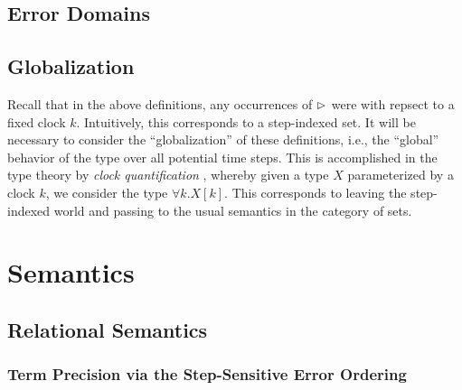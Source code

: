 \subsection{Error Domains}


\subsection{Globalization}

Recall that in the above definitions, any occurrences of $\vartriangleright$ were with
repsect to a fixed clock $k$. Intuitively, this corresponds to a step-indexed set.
It will be necessary to consider the ``globalization'' of these definitions,
i.e., the ``global'' behavior of the type over all potential time steps.
This is accomplished in the type theory by \emph{clock quantification} \cite{atkey-mcbride2013},
whereby given a type $X$ parameterized by a clock $k$, we consider the type
$\forall k. X[k]$. This corresponds to leaving the step-indexed world and passing to
the usual semantics in the category of sets.


\section{Semantics}\label{sec:semantics}


\subsection{Relational Semantics}

\subsubsection{Term Precision via the Step-Sensitive Error Ordering}

